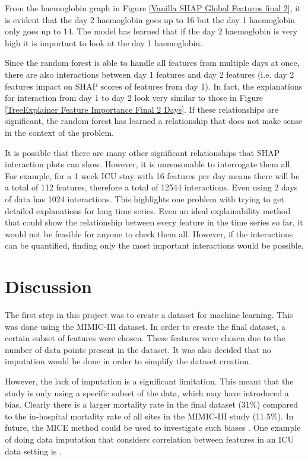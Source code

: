 \documentclass[12pt]{article}
\begin{document}
From the haemoglobin graph in Figure \ref{Vanilla SHAP Global Features final 2}, it is evident that the day 2 haemoglobin goes up to 16 but the day 1 haemoglobin only goes up to 14. The model has learned that if the day 2 haemoglobin is very high it is important to look at the day 1 haemoglobin. 


Since the random forest is able to handle all features from multiple days at once, there are also interactions between day 1 features and day 2 features (i.e. day 2 features impact on SHAP scores of features from day 1). In fact, the explanations for interaction from day 1 to day 2 look very similar to those in Figure \ref{TreeExplainer Feature Importance Final 2 Days}. If these relationships are significant, the random forest has learned a relationship that does not make sense in the context of the problem.

It is possible that there are many other significant relationships that SHAP interaction plots can show. However, it is unreasonable to interrogate them all. For example, for a 1 week ICU stay with 16 features per day means there will be a total of 112 features, therefore a total of 12544 interactions. Even using 2 days of data has 1024 interactions. This highlights one problem with trying to get detailed explanations for long time series. Even an ideal explainability method that could show the relationship between every feature in the time series so far, it would not be feasible for anyone to check them all. However, if the interactions can be quantified, finding only the most important interactions would be possible.


\section{Discussion}

The first step in this project was to create a dataset for machine learning. This was done using the MIMIC-III dataset. In order to create the final dataset, a certain subset of features were chosen. These features were chosen due to the number of data points present in the dataset. It was also decided that no imputation would be done in order to simplify the dataset creation.

However, the lack of imputation is a significant limitation. This meant that the study is only using a specific subset of the data, which may have introduced a bias. Clearly there is a larger mortality rate in the final dataset (31\%) compared to the in-hospital mortality rate of all sites in the MIMIC-III study (11.5\%). In future, the MICE method could be used to investigate such biases \cite{MICE}. One example of doing data imputation that considers correlation between features in an ICU data setting is \cite{ICUMortalityImpute}.
\end{document}
